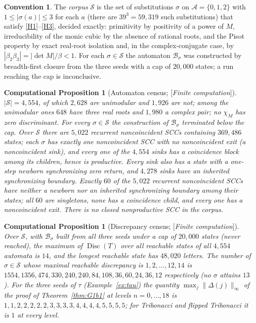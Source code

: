 \documentclass[11pt]{amsart}
\theoremstyle{plain}
\newtheorem{computation}[theorem]{Computational Proposition}
\theoremstyle{definition}
\newtheorem{convention}[theorem]{Convention}
\theoremstyle{remark}
\newcommand{\A}{\mathcal{A}}
\newcommand{\B}{\mathcal{B}}
\newcommand{\Disc}{\operatorname{Disc}}
\newcommand{\Status}[1]{\textup{[\textit{#1}]}}
\begin{document}
\begin{convention}\label{conv:corpus}
The \emph{corpus} $\mathcal S$ is the set of substitutions $\sigma$ on $\A=\{0,1,2\}$ with $1\le|\sigma(a)|\le3$ for each $a$ (there are $39^3=59{,}319$ such substitutions) that satisfy \ref{H1}--\ref{H3}, decided exactly: primitivity by positivity of a power of $M$, irreducibility of the monic cubic by the absence of rational roots, and the Pisot property by exact real-root isolation and, in the complex-conjugate case, by $|\beta_2\beta_3|=|\det M|/\beta<1$. For each $\sigma\in\mathcal S$ the automaton $\B_\sigma$ was constructed by breadth-first closure from the three seeds with a cap of $20{,}000$ states; a run reaching the cap is inconclusive.
\end{convention}

\begin{computation}[Automaton census; \Status{Finite computation}]\label{comp:bpa}
$|\mathcal S|=4{,}554$, of which $2{,}628$ are unimodular and $1{,}926$ are not; among the unimodular ones $648$ have three real roots and $1{,}980$ a complex pair; no $\chi_M$ has zero discriminant. For every $\sigma\in\mathcal S$ the construction of $\B_\sigma$ terminated below the cap. Over $\mathcal S$ there are $5{,}022$ recurrent noncoincident SCCs containing $369{,}486$ states; each $\sigma$ has exactly one noncoincident SCC with no noncoincident exit (a \emph{noncoincident sink}), and every one of the $4{,}554$ sinks has a coincidence block among its children, hence is productive. Every sink also has a state with a one-step newborn synchronizing zero return, and $4{,}278$ sinks have an inherited synchronizing boundary. Exactly $60$ of the $5{,}022$ recurrent noncoincident SCCs have neither a newborn nor an inherited synchronizing boundary among their states; all $60$ are singletons, none has a coincidence child, and every one has a noncoincident exit. There is no closed nonproductive SCC in the corpus.
\end{computation}

\begin{computation}[Discrepancy census; \Status{Finite computation}]\label{comp:disc}
Over $\mathcal S$, with $\B_\sigma$ built from all three seeds under a cap of $20{,}000$ states (never reached), the maximum of $\Disc(T)$ over all reachable states of all $4{,}554$ automata is $14$, and the longest reachable state has $48{,}020$ letters. The number of $\sigma\in\mathcal S$ whose maximal reachable discrepancy is $1,2,\dots,12,14$ is $1554,1356,474,330,240,240,84,108,36,60,24,36,12$ respectively (no $\sigma$ attains $13$). For the three seeds of $\tau$ (Example~\ref{ex:tau}) the quantity $\max_j\|\Delta(j)\|_\infty$ of the proof of Theorem~\ref{thm:G1b1} at levels $n=0,\dots,18$ is $1,1,2,2,2,2,2,3,3,3,3,4,4,4,4,5,5,5,5$; for Tribonacci and flipped Tribonacci it is $1$ at every level.
\end{computation}
\end{document}
